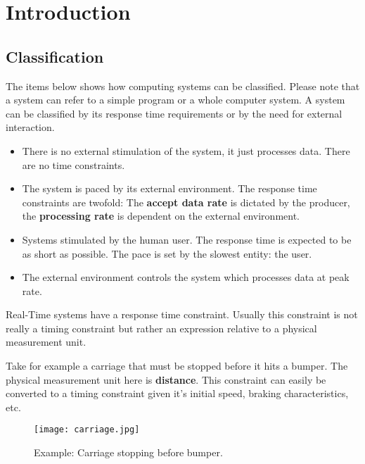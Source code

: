 \documentclass[../main.tex]{subfiles}
\begin{document}
\chapter{Introduction}

\section{Classification}

The items below shows how computing systems can be classified. Please note that a system can refer to a simple program or a whole computer system. A system can be classified by its response time requirements or by the need for external interaction. 

\begin{itemize}
	\item {} 
	There is no external stimulation of the system, it just processes data. There are no time constraints.
	\item {}
	The system is paced by its external environment. The response time constraints are twofold: The \textbf{accept data rate} is dictated by the producer, the \textbf{processing rate} is dependent on the external environment.
	\item {}
	Systems stimulated by the human user. The response time is expected to be as short as possible. The pace is set by the slowest entity: the user.
	\item {}
	The external environment controls the system which processes data at peak rate.
\end{itemize}

Real-Time systems have a response time constraint. Usually this constraint is not really a timing constraint but rather an expression relative to a physical measurement unit.

\begin{exmp}
Take for example a carriage that must be stopped before it hits a bumper. The physical measurement unit here is \textbf{distance}. This constraint can easily be converted to a timing constraint given it's initial speed, braking characteristics, etc. 
\begin{figure}[H]
    \centering
    \texttt{[image: carriage.jpg]}
    \caption{Example: Carriage stopping before bumper.}
    \label{carriage}
\end{figure}
\end{exmp}
\end{document}
